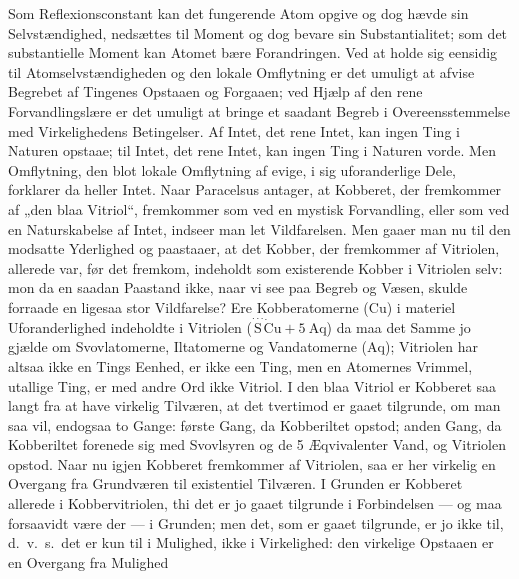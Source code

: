 \documentclass[12pt,a4paper]{book}
\begin{document}
Som Reflexionsconstant kan det fungerende Atom
opgive og dog hævde sin Selvstændighed, nedsættes til Moment
og dog bevare sin Substantialitet; som det substantielle
Moment kan Atomet bære Forandringen. Ved at holde sig
eensidig til Atomselvstændigheden og den lokale Omflytning er
det umuligt at afvise Begrebet af Tingenes Opstaaen og
Forgaaen; ved Hjælp af den rene Forvandlingslære er det
umuligt at bringe et saadant Begreb i Overeensstemmelse
med Virkelighedens Betingelser. Af Intet, det rene Intet,
kan ingen Ting i Naturen opstaae; til Intet, det rene Intet,
kan ingen Ting i Naturen vorde. Men Omflytning, den blot
lokale Omflytning af evige, i sig uforanderlige Dele,
forklarer da heller Intet. Naar Paracelsus antager, at Kobberet,
der fremkommer af „den blaa Vitriol“, fremkommer som ved
en mystisk Forvandling, eller som ved en Naturskabelse af
Intet, indseer man let Vildfarelsen. Men gaaer man nu
til den modsatte Yderlighed og paastaaer, at det Kobber, der
fremkommer af Vitriolen, allerede var, før det fremkom,
indeholdt som existerende Kobber i Vitriolen selv: mon da
en saadan Paastand ikke, naar vi see paa Begreb og Væsen,
skulde forraade en ligesaa stor Vildfarelse? Ere Kobberatomerne
($\mathrm{Cu}$) i materiel Uforanderlighed indeholdte i Vitriolen
($\stackrel{\cdot\cdot\cdot}{\mathrm{S}}\dot{\mathrm{C}}\mathrm{u}
+ 5\ \mathrm{Aq}$) da maa det Samme jo gjælde om Svovlatomerne,
Iltatomerne og Vandatomerne ($\mathrm{Aq}$); Vitriolen har altsaa
ikke en Tings Eenhed, er ikke een Ting, men en Atomernes
Vrimmel, utallige Ting, er med andre Ord ikke Vitriol.
I den blaa Vitriol er Kobberet saa langt fra at have
virkelig Tilværen, at det tvertimod er gaaet tilgrunde, om man
saa vil, endogsaa to Gange: første Gang, da Kobberiltet
opstod; anden Gang, da Kobberiltet forenede sig med
Svovlsyren og de 5 Æqvivalenter Vand, og Vitriolen opstod.
Naar nu igjen Kobberet fremkommer af Vitriolen, saa er her
virkelig en Overgang fra Grundværen til existentiel Tilværen.
I Grunden er Kobberet allerede i Kobbervitriolen, thi det er
jo gaaet tilgrunde i Forbindelsen --- og maa forsaavidt
være der --- i Grunden; men det, som er gaaet tilgrunde, er
jo ikke til, d.~v.~s.\ det er kun til i Mulighed, ikke i
Virkelighed: den virkelige Opstaaen er en Overgang fra Mulighed
\end{document}
